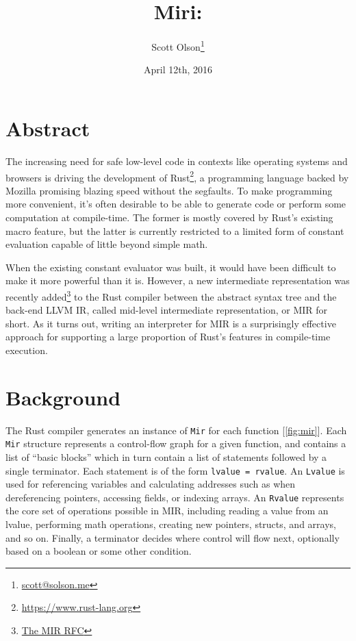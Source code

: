 \documentclass[twocolumn]{article}
\newcommand{\rust}[1]{\texttt{#1}}
\begin{document}
\title{Miri: \\ }
\author{Scott Olson\footnote{\href{mailto:scott@solson.me}{scott@solson.me}} \\
  }
\date{April 12th, 2016}
\maketitle


\section{Abstract}

The increasing need for safe low-level code in contexts like operating systems and browsers is
driving the development of Rust\footnote{\url{https://www.rust-lang.org}}, a programming language
backed by Mozilla promising blazing speed without the segfaults. To make programming more
convenient, it's often desirable to be able to generate code or perform some computation at
compile-time. The former is mostly covered by Rust's existing macro feature, but the latter is
currently restricted to a limited form of constant evaluation capable of little beyond simple math.

When the existing constant evaluator was built, it would have been difficult to make it more
powerful than it is. However, a new intermediate representation was recently
added\footnote{\href{https://github.com/rust-lang/rfcs/blob/master/text/1211-mir.md}{The MIR RFC}}
to the Rust compiler between the abstract syntax tree and the back-end LLVM IR, called mid-level
intermediate representation, or MIR for short. As it turns out, writing an interpreter for MIR is a
surprisingly effective approach for supporting a large proportion of Rust's features in compile-time
execution.


\section{Background}

The Rust compiler generates an instance of \rust{Mir} for each function [\autoref{fig:mir}]. Each
\rust{Mir} structure represents a control-flow graph for a given function, and contains a list of
``basic blocks'' which in turn contain a list of statements followed by a single terminator. Each
statement is of the form \rust{lvalue = rvalue}. An \rust{Lvalue} is used for referencing variables
and calculating addresses such as when dereferencing pointers, accessing fields, or indexing arrays.
An \rust{Rvalue} represents the core set of operations possible in MIR, including reading a value
from an lvalue, performing math operations, creating new pointers, structs, and arrays, and so on.
Finally, a terminator decides where control will flow next, optionally based on a boolean or some
other condition.
\end{document}
